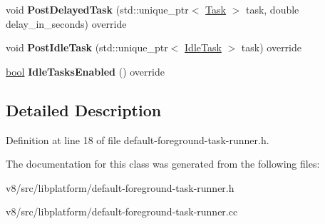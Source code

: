 \begin{DoxyCompactItemize}
\item 
\mbox{\label{classv8_1_1platform_1_1DefaultForegroundTaskRunner_a51ac3c5e525915d7da14e62df8360260}} 
void {\bfseries Post\+Delayed\+Task} (std\+::unique\+\_\+ptr$<$ \mbox{\hyperlink{classv8_1_1Task}{Task}} $>$ task, double delay\+\_\+in\+\_\+seconds) override
\item 
\mbox{\label{classv8_1_1platform_1_1DefaultForegroundTaskRunner_a9a786d811ce222e8dc3ecd0045d089a6}} 
void {\bfseries Post\+Idle\+Task} (std\+::unique\+\_\+ptr$<$ \mbox{\hyperlink{classv8_1_1IdleTask}{Idle\+Task}} $>$ task) override
\item 
\mbox{\label{classv8_1_1platform_1_1DefaultForegroundTaskRunner_a44360ea2412113db3a6caed4e58b59ae}} 
\mbox{\hyperlink{classbool}{bool}} {\bfseries Idle\+Tasks\+Enabled} () override
\end{DoxyCompactItemize}


\subsection{Detailed Description}


Definition at line 18 of file default-\/foreground-\/task-\/runner.\+h.



The documentation for this class was generated from the following files\+:\begin{DoxyCompactItemize}
\item 
v8/src/libplatform/default-\/foreground-\/task-\/runner.\+h\item 
v8/src/libplatform/default-\/foreground-\/task-\/runner.\+cc\end{DoxyCompactItemize}
